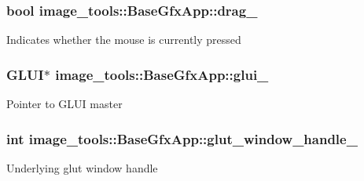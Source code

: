 \subsubsection[{\texorpdfstring{drag\+\_\+}{drag_}}]{\setlength{\rightskip}{0pt plus 5cm}bool image\+\_\+tools\+::\+Base\+Gfx\+App\+::drag\+\_\+\hspace{0.3cm}{\ttfamily [private]}}\hypertarget{classimage__tools_1_1BaseGfxApp_aa5d008059dc45fbdd387c1dcc9ef44e8}{}\label{classimage__tools_1_1BaseGfxApp_aa5d008059dc45fbdd387c1dcc9ef44e8}
Indicates whether the mouse is currently pressed 
\subsubsection[{\texorpdfstring{glui\+\_\+}{glui_}}]{\setlength{\rightskip}{0pt plus 5cm}G\+L\+UI$\ast$ image\+\_\+tools\+::\+Base\+Gfx\+App\+::glui\+\_\+\hspace{0.3cm}{\ttfamily [private]}}\hypertarget{classimage__tools_1_1BaseGfxApp_af61bab5d0a9ff2bf95c3275b6f895d8e}{}\label{classimage__tools_1_1BaseGfxApp_af61bab5d0a9ff2bf95c3275b6f895d8e}
Pointer to G\+L\+UI master 
\subsubsection[{\texorpdfstring{glut\+\_\+window\+\_\+handle\+\_\+}{glut_window_handle_}}]{\setlength{\rightskip}{0pt plus 5cm}int image\+\_\+tools\+::\+Base\+Gfx\+App\+::glut\+\_\+window\+\_\+handle\+\_\+\hspace{0.3cm}{\ttfamily [private]}}\hypertarget{classimage__tools_1_1BaseGfxApp_a80d2d760d3c777be50dcfb96466746f0}{}\label{classimage__tools_1_1BaseGfxApp_a80d2d760d3c777be50dcfb96466746f0}
Underlying glut window handle 
